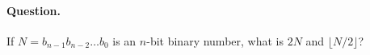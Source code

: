 \paragraph{Question.} If \(N=b_{n-1}b_{n-2}\dots b_0\) is an \(n\)-bit
binary number, what is \(2N\) and \(\lfloor{N/2}\rfloor\)?
